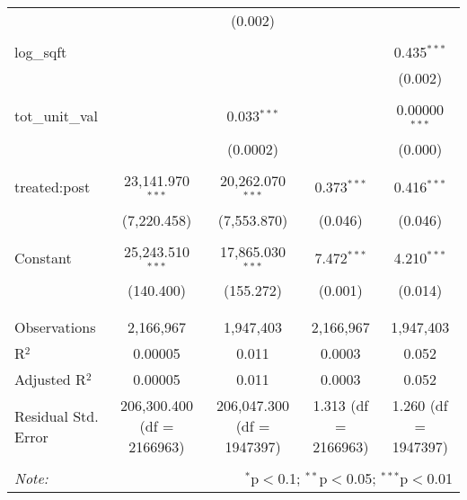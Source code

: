 \begin{table}[H]
{\begin{tabular}{@{\extracolsep{5pt}}lcccc}
   &  & (0.002) &  &  \\  

   & & & & \\  

  log\_sqft &  &  &  & 0.435$^{***}$ \\  

   &  &  &  & (0.002) \\  

   & & & & \\  

  tot\_unit\_val &  & 0.033$^{***}$ &  & 0.00000$^{***}$ \\  

   &  & (0.0002) &  & (0.000) \\  

   & & & & \\  

  treated:post & 23,141.970$^{***}$ & 20,262.070$^{***}$ & 0.373$^{***}$ & 0.416$^{***}$ \\  

   & (7,220.458) & (7,553.870) & (0.046) & (0.046) \\  

   & & & & \\  

  Constant & 25,243.510$^{***}$ & 17,865.030$^{***}$ & 7.472$^{***}$ & 4.210$^{***}$ \\  

   & (140.400) & (155.272) & (0.001) & (0.014) \\  

   & & & & \\  

 \hline \\[-1.8ex]  

 Observations & 2,166,967 & 1,947,403 & 2,166,967 & 1,947,403 \\  

 R$^{2}$ & 0.00005 & 0.011 & 0.0003 & 0.052 \\  

 Adjusted R$^{2}$ & 0.00005 & 0.011 & 0.0003 & 0.052 \\  

 Residual Std. Error & 206,300.400 (df = 2166963) & 206,047.300 (df = 1947397) & 1.313 (df = 2166963) & 1.260 (df = 1947397) \\  

 \hline  

 \hline \\[-1.8ex]  

 \textit{Note:}  & \multicolumn{4}{r}{$^{*}$p$<$0.1; $^{**}$p$<$0.05; $^{***}$p$<$0.01} \\  

 \end{tabular}}  

 \end{table}  

